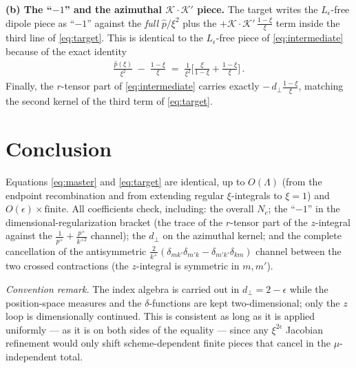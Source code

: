 \documentclass[10pt]{article}
\newcommand{\Leps}{L_{\epsilon}}
\begin{document}
\textbf{(b) The ``$-1$'' and the azimuthal $\mathcal K\!\cdot\!\mathcal K'$ piece.} The target writes the
$\Leps$-free dipole piece as ``$-1$'' against the \emph{full} $\hat p/\xi^{2}$ plus the
$+\mathcal K\!\cdot\!\mathcal K'\,\frac{1-\xi}{\xi}$ term inside the third line of \eqref{eq:target}.
This is identical to the $\Leps$-free piece of \eqref{eq:intermediate} because of the exact identity
\begin{align}
\frac{\hat p(\xi)}{\xi^{2}}\;-\;\frac{1-\xi}{\xi}
\;=\;\frac{1}{\xi^{2}}\Big[\frac{\xi}{1-\xi}+\frac{1-\xi}{\xi}\Big]\,.
\end{align}
Finally, the $r$-tensor part of \eqref{eq:intermediate} carries exactly
$-\,d_{\perp}\frac{1-\xi}{\xi}$, matching the second kernel of the third term of \eqref{eq:target}.

\section*{Conclusion}
Equations \eqref{eq:master} and \eqref{eq:target} are identical, up to $O(\Lambda)$ (from the endpoint
recombination and from extending regular $\xi$-integrals to $\xi=1$) and
$O(\epsilon)\times\text{finite}$. All coefficients check, including: the overall $N_{c}$; the
``$-1$'' in the dimensional-regularization bracket (the trace of the $r$-tensor part of the
$z$-integral against the $\frac{1}{p^{+}}+\frac{p^{+}}{k^{+2}}$ channel); the $d_{\perp}$ on the
azimuthal kernel; and the complete cancellation of the antisymmetric
$\frac{2}{k^{+}}(\delta_{mk'}\delta_{m'k}-\delta_{m'k'}\delta_{km})$ channel between the two crossed
contractions (the $z$-integral is symmetric in $m,m'$).

\emph{Convention remark.} The index algebra is carried out in $d_{\perp}=2-\epsilon$ while the
position-space measures and the $\delta$-functions are kept two-dimensional; only the $z$ loop is
dimensionally continued. This is consistent as long as it is applied uniformly --- as it is on both
sides of the equality --- since any $\xi^{2\epsilon}$ Jacobian refinement would only shift
scheme-dependent finite pieces that cancel in the $\mu$-independent total.
\end{document}
